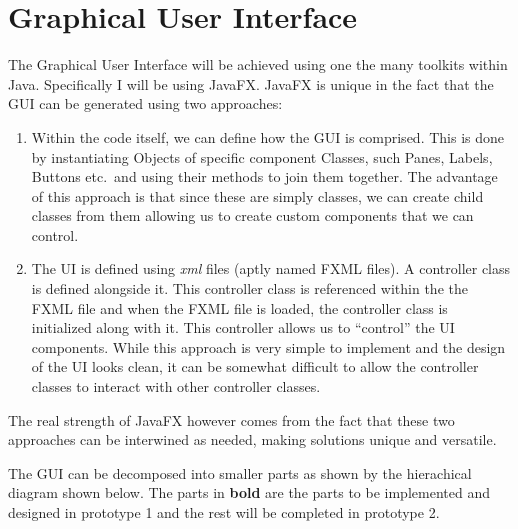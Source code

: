 \documentclass[../../../../main.tex]{subfiles}
\begin{document}
\section{Graphical User Interface}
The Graphical User Interface will be achieved using one the many toolkits within Java. Specifically I will be using JavaFX. JavaFX is unique in the fact that the GUI can be generated using two approaches:
\begin{enumerate}
\item Within the code itself, we can define how the GUI is comprised. This is done by instantiating Objects of specific component Classes, such Panes, Labels, Buttons etc.\, and using their methods to join them together. The advantage of this approach is that since these are simply classes, we can create child classes from them allowing us to create custom components that we can control.
\item The UI is defined using \textit{xml} files (aptly named FXML files). A controller class is defined alongside it. This controller class is referenced within the the FXML file and when the FXML file is loaded, the controller class is initialized along with it. This controller allows us to ``control'' the UI components. While this approach is very simple to implement and the design of the UI looks clean, it can be somewhat difficult to allow the controller classes to interact with other controller classes.
\end{enumerate}
The real strength of JavaFX however comes from the fact that these two approaches can be interwined as needed, making solutions unique and versatile. 

The GUI can be decomposed into smaller parts as shown by the hierachical diagram shown below. The parts in \textbf{bold} are the parts to be implemented and designed in prototype 1 and the rest will be completed in prototype 2.
\end{document}
